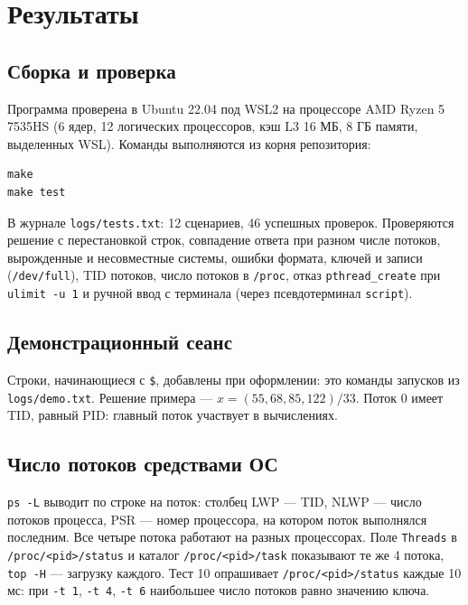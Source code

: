 \section{Результаты}

\subsection{Сборка и проверка}

Программа проверена в Ubuntu 22.04 под WSL2 на процессоре AMD Ryzen 5 7535HS
(6 ядер, 12 логических процессоров, кэш L3 16 МБ, 8 ГБ памяти, выделенных WSL).
Команды выполняются из корня репозитория:
\begin{verbatim}
make
make test
\end{verbatim}
В журнале \texttt{logs/tests.txt}: 12 сценариев, 46 успешных проверок.
Проверяются решение с перестановкой строк, совпадение ответа при разном числе
потоков, вырожденные и несовместные системы, ошибки формата, ключей и записи
(\texttt{/dev/full}), TID потоков, число потоков в \texttt{/proc}, отказ
\texttt{pthread\_create} при \texttt{ulimit -u 1} и ручной ввод с терминала
(через псевдотерминал \texttt{script}).



\subsection{Демонстрационный сеанс}



Строки, начинающиеся с \texttt{\$}, добавлены при оформлении: это команды
запусков из \texttt{logs/demo.txt}. Решение примера --- $x = (55, 68, 85, 122)/33$.
Поток 0 имеет TID, равный PID: главный поток участвует в вычислениях.

\subsection{Число потоков средствами ОС}



\texttt{ps -L} выводит по строке на поток: столбец LWP --- TID, NLWP --- число
потоков процесса, PSR --- номер процессора, на котором поток выполнялся
последним. Все четыре потока работают на разных процессорах. Поле
\texttt{Threads} в \texttt{/proc/<pid>/status} и каталог \texttt{/proc/<pid>/task}
показывают те же 4 потока, \texttt{top -H} --- загрузку каждого.
Тест 10 опрашивает \texttt{/proc/<pid>/status} каждые 10 мс: при \texttt{-t 1},
\texttt{-t 4}, \texttt{-t 6} наибольшее число потоков равно значению ключа.

